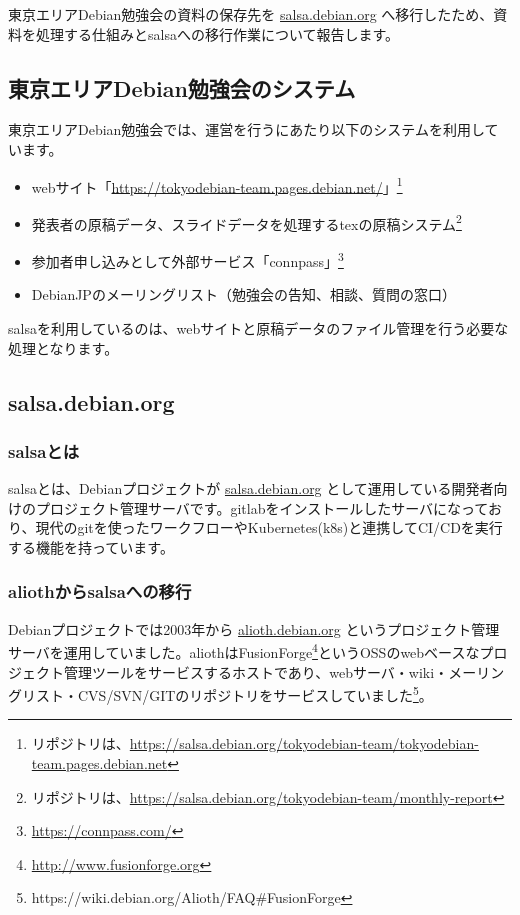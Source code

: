 \documentclass[mingoth,a4paper]{jsarticle}
\begin{document}
東京エリアDebian勉強会の資料の保存先を \url{salsa.debian.org} へ移行したため、資料を処理する仕組みとsalsaへの移行作業について報告します。


\subsection{東京エリアDebian勉強会のシステム}

東京エリアDebian勉強会では、運営を行うにあたり以下のシステムを利用しています。

\begin{itemize}
  \item webサイト「\url{https://tokyodebian-team.pages.debian.net/}」\footnote{リポジトリは、\url{https://salsa.debian.org/tokyodebian-team/tokyodebian-team.pages.debian.net}}
  \item 発表者の原稿データ、スライドデータを処理するtexの原稿システム\footnote{リポジトリは、\url{https://salsa.debian.org/tokyodebian-team/monthly-report}}
  \item 参加者申し込みとして外部サービス「connpass」\footnote{\url{https://connpass.com/}}
  \item DebianJPのメーリングリスト（勉強会の告知、相談、質問の窓口）
\end{itemize}


salsaを利用しているのは、webサイトと原稿データのファイル管理を行う必要な処理となります。


\subsection{salsa.debian.org}

\subsubsection{salsaとは}

salsaとは、Debianプロジェクトが \url{salsa.debian.org} として運用している開発者向けのプロジェクト管理サーバです。gitlabをインストールしたサーバになっており、現代のgitを使ったワークフローやKubernetes(k8s)と連携してCI/CDを実行する機能を持っています。 


\subsubsection{aliothからsalsaへの移行}

Debianプロジェクトでは2003年から \url{alioth.debian.org} というプロジェクト管理サーバを運用していました。aliothはFusionForge\footnote{\url{http://www.fusionforge.org}}というOSSのwebベースなプロジェクト管理ツールをサービスするホストであり、webサーバ・wiki・メーリングリスト・CVS/SVN/GITのリポジトリをサービスしていました\footnote{https://wiki.debian.org/Alioth/FAQ\#FusionForge}。
\end{document}

